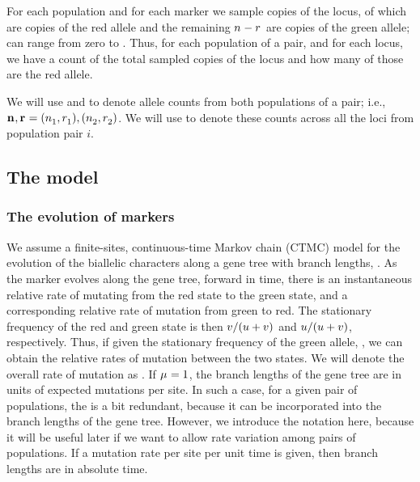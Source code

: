 For each population and for each marker we sample \allelecount
copies of the locus, \redallelecount of which are copies of the red
allele and the remaining $\allelecount - \redallelecount$ are
copies of the green allele;
\redallelecount can range from zero to \allelecount.
Thus, for each population of a pair, and for each locus, we have a count of the
total sampled copies of the locus and how many of those are the red allele.

We will use \leafallelecounts and \leafredallelecounts to denote allele counts
from both populations of a pair; i.e., 
$\leafallelecounts, \leafredallelecounts = (\allelecount[1], \redallelecount[1]), 
(\allelecount[2], \redallelecount[2])$.
We will use \comparisondata[i] to denote these counts across all the loci from
population pair $i$.


\subsection{The model}

\subsubsection{The evolution of markers}

We assume a finite-sites, continuous-time Markov chain (CTMC) model for the
evolution of the biallelic characters along a gene tree with branch lengths,
\genetree.
As the marker evolves along the gene tree, forward in time, there is an
instantaneous relative rate \rgmurate of mutating from the red state to the
green state, and a corresponding relative rate \grmurate of mutation from green
to red.
The stationary frequency of the red and green state is then
$\grmurate / (\rgmurate + \grmurate)$
and
$\rgmurate / (\rgmurate + \grmurate)$, respectively.
Thus, if given the stationary frequency of the green allele, \gfreq, we can
obtain the relative rates of mutation between the two states.
We will denote the overall rate of mutation as \murate.
If $\murate = 1$, the branch lengths of the gene tree are in units of expected
mutations per site.
In such a case, for a given pair of populations, the \murate is a bit
redundant, because it can be incorporated into the branch lengths of the gene
tree.
However, we introduce the notation here, because it will be useful later if we
want to allow rate variation among pairs of populations.
If a mutation rate per site per unit time is given, then branch lengths are in
absolute time.

